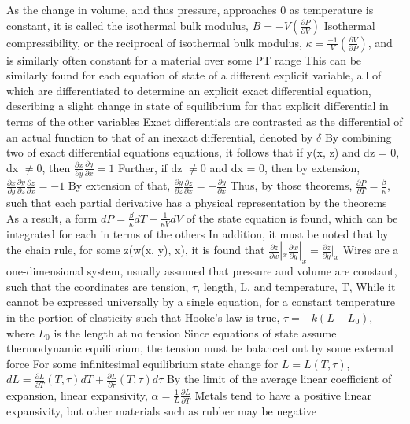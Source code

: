 \documentclass[11 pt, twoside]{article}
\newenvironment{outline*}
{
	\begin{outline}[enumerate]
	}
	{\end{outline}
}
\begin{document}
\begin{outline*}
\4 As the change in volume, and thus pressure, approaches 0 as temperature is constant, it is called the isothermal bulk modulus, $B = -V(\frac{\partial P}{\partial V})$
\4 Isothermal compressibility, or the reciprocal of isothermal bulk modulus, $\kappa = \frac{-1}{V}(\frac{\partial V}{\partial P})$, and is similarly often constant for a material over some PT range
\2 This can be similarly found for each equation of state of a different explicit variable, all of which are differentiated to determine an explicit exact differential equation, describing a slight change in state of equilibrium for that explicit differential in terms of the other variables
\3 Exact differentials are contrasted as the differential of an actual function to that of an inexact differential, denoted by $\delta$
\3 By combining two of exact differential equations equations, it follows that if y(x, z) and dz = 0, dx $\neq 0$, then $\frac{\partial x}{\partial y}\frac{\partial y}{\partial x} = 1$
\4 Further, if dz $\neq 0$ and dx = 0, then by extension, $\frac{\partial x}{\partial y}\frac{\partial y}{\partial z}\frac{\partial z}{\partial x} = -1$
\4 By extension of that, $\frac{\partial y}{\partial z}\frac{\partial z}{\partial x} = -\frac{\partial y}{\partial x}$
\3 Thus, by those theorems, $\frac{\partial P}{\partial T} = \frac{\beta}{\kappa}$, such that each partial derivative has a physical representation by the theorems
\4 As a result, a form $dP = \frac{\beta}{\kappa}dT - \frac{1}{\kappa V}dV$ of the state equation is found, which can be integrated for each in terms of the others
\3 In addition, it must be noted that by the chain rule, for some z(w(x, y), x), it is found that $\frac{\partial z}{\partial w}|_x\frac{\partial w}{\partial y}|_x = \frac{\partial z}{\partial y}|_x$
\1 Wires are a one-dimensional system, usually assumed that pressure and volume are constant, such that the coordinates are tension, $\tau$, length, L, and temperature, T,
\2 While it cannot be expressed universally by a single equation, for a constant temperature in the portion of elasticity such that Hooke's law is true, $\tau = -k(L - L_0)$, where $L_0$ is the length at no tension
\3 Since equations of state assume thermodynamic equilibrium, the tension must be balanced out by some external force
\2 For some infinitesimal equilibrium state change for $L = L(T, \tau)$, $dL = \frac{\partial L}{\partial T}(T, \tau)dT + \frac{\partial L}{\partial \tau}(T, \tau)d\tau$
\3 By the limit of the average linear coefficient of expansion, linear expansivity, $\alpha = \frac{1}{L}\frac{\partial L}{\partial T}$
\4 Metals tend to have a positive linear expansivity, but other materials such as rubber may be negative

\end{outline*}
\end{document}
